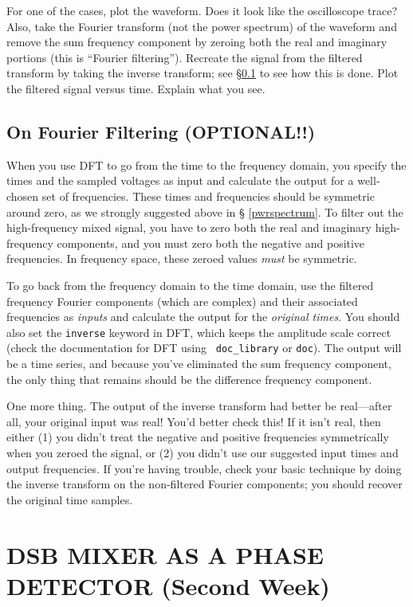 \documentclass[11pt,preprint]{aastex}
\begin{document}
For one of the cases, plot the waveform.  Does it look like the
oscilloscope trace? Also, take the Fourier transform (not the power
spectrum) of the waveform and remove the sum frequency component by
zeroing both the real and imaginary portions (this is ``Fourier
filtering'').  Recreate the signal from the filtered transform by taking
the inverse transform; see \S \ref{fourierfilter} to see how this is
done. Plot the filtered signal versus time.  Explain what you see.

\subsection {On  Fourier Filtering (OPTIONAL!!)} \label{fourierfilter}

When you use DFT to go from the time to the frequency domain, you
specify the times and the sampled voltages as input and calculate the
output for a well-chosen set of frequencies.  These times and
frequencies should be symmetric around zero, as we strongly suggested above in \S
\ref{pwrspectrum}.  To filter out the high-frequency mixed signal, you
have to zero both the real and imaginary high-frequency components,
and you must zero both the negative and positive frequencies. In
frequency space, these zeroed values {\it must} be symmetric.

To go back from the frequency domain to the time domain, use the 
  filtered frequency Fourier components (which are complex) and their associated frequencies
  as {\it inputs} and calculate the output for the {\it original times}.
  You should also set the {\tt inverse} keyword in DFT, which keeps the
  amplitude scale correct (check the documentation for DFT using {\tt
  doc\_library} or {\tt doc}). The output will be a time series, and because you've
  eliminated the sum frequency component, the only thing that remains
  should be the difference frequency component.

One more thing. The output of the inverse transform had better be
real---after all, your original input was real! You'd better check this!
If it isn't real, then either (1) you didn't treat the negative and positive
frequencies symmetrically when you zeroed the signal, or (2) you didn't
use our suggested input times and output frequencies. If you're having
trouble, check your basic technique by doing the inverse transform on
the non-filtered Fourier components; you should recover the original
time samples.

\section{DSB MIXER AS A PHASE DETECTOR (Second Week)} \label{phasedetector}
\end{document}
